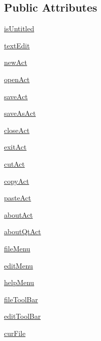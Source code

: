 \subsection*{Public Attributes}
\begin{DoxyCompactItemize}
\item 
\hyperlink{classsdi_1_1MainWindow_a559ee093dbc73feef649aee2b837c195}{is\+Untitled}
\item 
\hyperlink{classsdi_1_1MainWindow_a2e67bab515baf6f42cceed1722fe4e82}{text\+Edit}
\item 
\hyperlink{classsdi_1_1MainWindow_a1b2f031f16fe7d79038ccc481e5fa22a}{new\+Act}
\item 
\hyperlink{classsdi_1_1MainWindow_ae4521e3c6a4de7dc4a666d8ca7734444}{open\+Act}
\item 
\hyperlink{classsdi_1_1MainWindow_a921cbfe4bbd04c12aabc3bee8b66fabd}{save\+Act}
\item 
\hyperlink{classsdi_1_1MainWindow_a5482e6c027a72d7d1a79d42f0d612b73}{save\+As\+Act}
\item 
\hyperlink{classsdi_1_1MainWindow_a2c94cbd55d8e59a331b396733ca14bc4}{close\+Act}
\item 
\hyperlink{classsdi_1_1MainWindow_a3df5adfae6c443d95733b9a1b875fd21}{exit\+Act}
\item 
\hyperlink{classsdi_1_1MainWindow_a1af958393fb9278bccfc560f8816bc1b}{cut\+Act}
\item 
\hyperlink{classsdi_1_1MainWindow_a1801ba0d766d3332926fc0eff5437305}{copy\+Act}
\item 
\hyperlink{classsdi_1_1MainWindow_a064b4b3aea2cb9d220d182455c1a55a0}{paste\+Act}
\item 
\hyperlink{classsdi_1_1MainWindow_a98f7cd29d6869905eed036ce65dc1103}{about\+Act}
\item 
\hyperlink{classsdi_1_1MainWindow_a6185a63251b2b6c159f64e821e4601cd}{about\+Qt\+Act}
\item 
\hyperlink{classsdi_1_1MainWindow_acc64633fd125a7bb2f069f24fec14d63}{file\+Menu}
\item 
\hyperlink{classsdi_1_1MainWindow_a95c8846403eed7c5dbb1e451300b480c}{edit\+Menu}
\item 
\hyperlink{classsdi_1_1MainWindow_a27ef21a4c9bceb31b6c85db2b971da75}{help\+Menu}
\item 
\hyperlink{classsdi_1_1MainWindow_ae8dd14d5d9ee05f01d4ec77e4afcd753}{file\+Tool\+Bar}
\item 
\hyperlink{classsdi_1_1MainWindow_a3a5aa8ea2ca86c9584f608ec988f6214}{edit\+Tool\+Bar}
\item 
\hyperlink{classsdi_1_1MainWindow_aa5ab6e8619f96d5ffa4bda622ada0e67}{cur\+File}
\end{DoxyCompactItemize}
